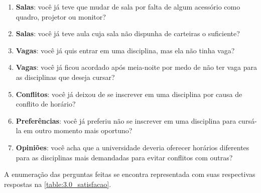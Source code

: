 \begin{apendicesenv}
  \begin{enumerate}
    \item \textbf{Salas}: você já teve que mudar de sala por falta de algum acessório como quadro, projetor ou monitor? %
    \item \textbf{Salas}: você já teve aula cuja sala não dispunha de carteiras o suficiente? %
    \item \textbf{Vagas}: você já quis entrar em uma disciplina, mas ela não tinha vaga? %
    \item \textbf{Vagas}: você já ficou acordado após meia-noite por medo de não ter vaga para as disciplinas que deseja cursar? %
    \item \textbf{Conflitos}: você já deixou de se inscrever em uma disciplina por causa de conflito de horário? %
    \item \textbf{Preferências}: você já preferiu não se inscrever em uma disciplina para cursá-la em outro momento mais oportuno? %
    \item \textbf{Opiniões}: você acha que a universidade deveria oferecer horários diferentes para as disciplinas mais demandadas para evitar conflitos com outras? %
  \end{enumerate}

  A enumeração das perguntas feitas se encontra representada com suas respectivas respostas na \autoref{table:3.0_satisfacao}.


\end{apendicesenv}
